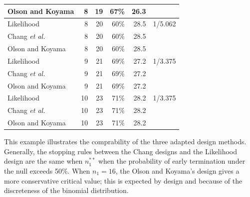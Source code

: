 \documentclass[12pt]{report}\usepackage[]{graphicx}\usepackage[]{color}
\newlength{\li}\setlength{\li}{14.48pt}
\newlength{\di}\setlength{\di}{-3.5mm}
\begin{document}
\begin{table}[]
\begin{tabular}{|L|R|R|R|R|L|}
Olson and Koyama & 8     & 19    & 67\%           & 26.3          &                                                                                    \\ \hline
Likelihood       & 8     & 20    & 60\%           & 28.5          & 1/5.062                                                                            \\ \hline
Chang \textit{et al.}           & 8     & 20    & 60\%           & 28.5          &                                                                                    \\ \hline
Olson and Koyama & 8     & 20    & 60\%           & 28.5          &                                                                                    \\ \hline
Likelihood       & 9     & 21    & 69\%           & 27.2          & 1/3.375                                                                            \\ \hline
Chang \textit{et al.}         & 9     & 21    & 69\%           & 27.2          &                                                                                    \\ \hline
Olson and Koyama & 9     & 21    & 69\%           & 27.2          &                                                                                    \\ \hline
Likelihood       & 10    & 23    & 71\%           & 28.2          & 1/3.375                                                                            \\ \hline
Chang \textit{et al.}  & 10    & 23    & 71\%           & 28.2          &                                                                                    \\ \hline
Olson and Koyama & 10    & 23    & 71\%           & 28.2          &                                                                                    \\ \hline
\end{tabular}
\hspace*{-0.1cm}
\end{table}

This example illustrates the comprability of the three adapted design methods. Generally, the stopping rules between the Chang designs and the Likelihood design are the same when $n_1^{\ast\ast}$ when the probability of early termination under the null exceeds 50\%. When $n_1 = 16$, the Olson and Koyama's design gives a more conservative critical value; this is expected by design and because of the discreteness of the binomial distribution. 
\end{document}

